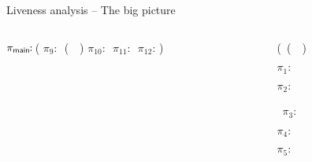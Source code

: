 \begin{frame}[t]{Liveness analysis -- The big picture}

\vspace*{-10mm}
\begin{columns}[c]
 \begin{column}[T]{0.5\textwidth}
\hspace*{-.3cm}\renewcommand{\arraystretch}{1}{
	  \begin{uprogram}
	  \hspace*{-.2cm} $\pi_{\sf main}\!\!:\, $(\onslide<0>{\LET\  \pz\  $\leftarrow$ \ldots  \IN
	  \UNL{2}   \hspace*{.3cm}              (\LET\ \py\  $\leftarrow$  \ldots \IN}
             \hspace*{-.5cm}    $\pi_9\!\!:\, $  (\append\ \py\ \pz) 
             \hspace*{-.8cm}  $\pi_{10}\!\!:\, $
	     \hspace*{-1.1cm}  $\pi_{11}\!\!:\, $\onslide<0>{(\LET\ \pb\  $\leftarrow$ (\CAR\  \pa) \IN}
             \hspace*{-1.4cm} $\pi_{12}\!\!:\,$)
\end{uprogram}}
 \end{column}
 \begin{column}[T]{0.6\textwidth}
\hspace*{.4cm}  \renewcommand{\arraystretch}{1}{
  \begin{uprogram}
    \hspace*{-.7cm} (\DEFINE\ (\append~\lista~\listb)

    \hspace*{-1cm}  $\pi_1\!\!:\, $


     \hspace*{-1.4cm}     $\pi_2\!\!:\, $

~$\pi_3\!\!:$ 
 
          \hspace*{-1.8cm} \hspace*{.05cm}    
 $\pi_4\!\!:\, $

	  \hspace*{-2.1cm}  \hspace*{.05cm}    $\pi_5\!\!:\,$\onslide<0>{  \IN}



\end{uprogram}}
\end{column}
\end{columns}
\end{frame}
